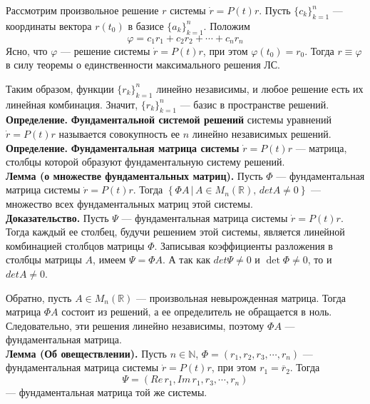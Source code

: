 \documentclass{article}
\begin{document}
Рассмотрим произвольное решение $r$ системы $\dot{r} = P(t)r$. Пусть $\{c_k\}_{k=1}^n$ --- координаты вектора $r(t_0)$ в базисе $\{a_k\}_{k=1}^n$. Положим
\begin{equation*}
    \varphi = c_1r_1 + c_2r_2 + \cdots + c_nr_n
\end{equation*}
Ясно, что $\varphi$ --- решение системы $\dot{r} = P(t)r$, при этом $\varphi(t_0) = r_0$. Тогда $r \equiv \varphi$ в силу теоремы о единственности максимального решения ЛС.

Таким образом, функции $\{r_k\}_{k=1}^n$ линейно независимы, и любое решение есть их линейная комбинация. Значит, $\{r_k\}_{k=1}^n$ --- базис в пространстве решений.\\

\noindent \textbf{Определение.} \textbf{Фундаментальной системой решений} системы уравнений $\dot{r} = P(t)r$ называется совокупность ее $n$ линейно независимых решений.\\

\noindent \textbf{Определение.} \textbf{Фундаментальная матрица системы} $\dot{r} = P(t)r$ --- матрица, столбцы которой образуют фундаментальную систему решений.\\

\noindent \textbf{Лемма (о множестве фундаментальных матриц).} Пусть $\Phi$ --- фундаментальная матрица системы $\dot{r} = P(t)r$. Тогда $\left\{\Phi A \, | \, A \in M_n(\mathbb{R}), \, detA \neq 0 \right\}$ --- множество всех фундаментальных матриц этой системы.\\

\noindent \textbf{Доказательство.} Пусть $\Psi$ --- фундаментальная матрица системы $\dot{r} = P(t)r$. Тогда каждый ее столбец, будучи решением этой системы, является линейной комбинацией столбцов матрицы $\Phi$. Записывая коэффициенты разложения в столбцы матрицы $A$, имеем $\Psi = \Phi A$. А так как $det \Psi \neq 0$ и $\det \Phi \neq 0$, то и $det A \neq 0$.

Обратно, пусть $A \in M_n(\mathbb{R})$ --- произвольная невырожденная матрица. Тогда матрица $\Phi A$ состоит из решений, а ее определитель не обращается в ноль. Следовательно, эти решения линейно независимы, поэтому $\Phi A$ --- фундаментальная матрица.\\

\noindent \textbf{Лемма (Об овеществлении).} Пусть $n \in \mathbb{N}$, $\Phi = (r_1,r_2,r_3,\cdots,r_n)$ --- фундаментальная матрица системы $\dot{r} = P(t)r$, при этом $r_1 = \overline{r}_2$. Тогда
\begin{equation*}
    \Psi = (Re\,r_1, Im\,r_1, r_3, \cdots, r_n)
\end{equation*}
--- фундаментальная матрица той же системы.\\
\end{document}
